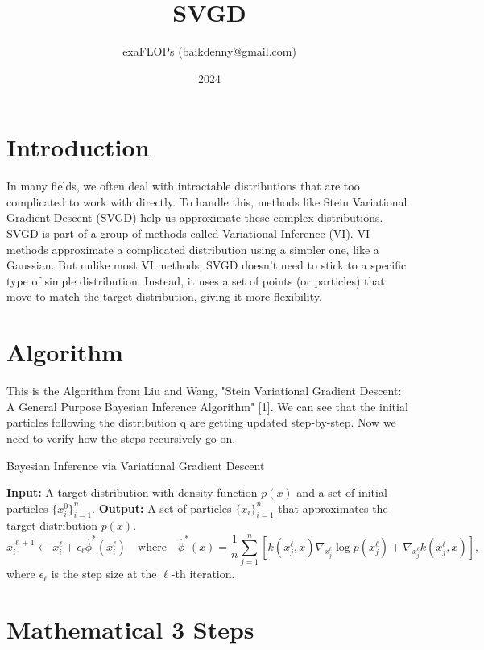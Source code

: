 \documentclass{article}
\title{SVGD}
\author{
exaFLOPs (baikdenny@gmail.com)
}
\date{2024}
\begin{document}
\maketitle

\section{Introduction}

In many fields, we often deal with intractable distributions that are too complicated to work with directly. To handle this, methods like Stein Variational Gradient Descent (SVGD) help us approximate these complex distributions. SVGD is part of a group of methods called Variational Inference (VI). VI methods approximate a complicated distribution using a simpler one, like a Gaussian. But unlike most VI methods, SVGD doesn’t need to stick to a specific type of simple distribution. Instead, it uses a set of points (or particles) that move to match the target distribution, giving it more flexibility.
\section{Algorithm}
This is the Algorithm from Liu and Wang, "Stein Variational Gradient Descent: A General Purpose Bayesian Inference Algorithm" [1]. We can see that the initial particles following the distribution q are getting updated step-by-step. Now we need to verify how the steps recursively go on.



\begin{algorithm}
\caption{Bayesian Inference via Variational Gradient Descent}
\begin{algorithmic}
    \STATE \textbf{Input:} A target distribution with density function $p(x)$ and a set of initial particles $\{x_i^0\}_{i=1}^n$.
    \STATE \textbf{Output:} A set of particles $\{x_i\}_{i=1}^n$ that approximates the target distribution $p(x)$.
    \STATE
        \STATE \[
        x_i^{\ell+1} \gets x_i^{\ell} + \epsilon_{\ell} \hat{\phi}^*(x_i^{\ell}) \quad \text{where} \quad \hat{\phi}^*(x) = \frac{1}{n} \sum_{j=1}^n \left[ k(x_j^{\ell}, x) \nabla_{x_j^{\ell}} \log p(x_j^{\ell}) + \nabla_{x_j^{\ell}} k(x_j^{\ell}, x) \right],
        \]
        \STATE where $\epsilon_{\ell}$ is the step size at the $\ell$-th iteration.
    \ENDFOR
\end{algorithmic}
\end{algorithm}

\section{Mathematical 3 Steps}
\end{document}
